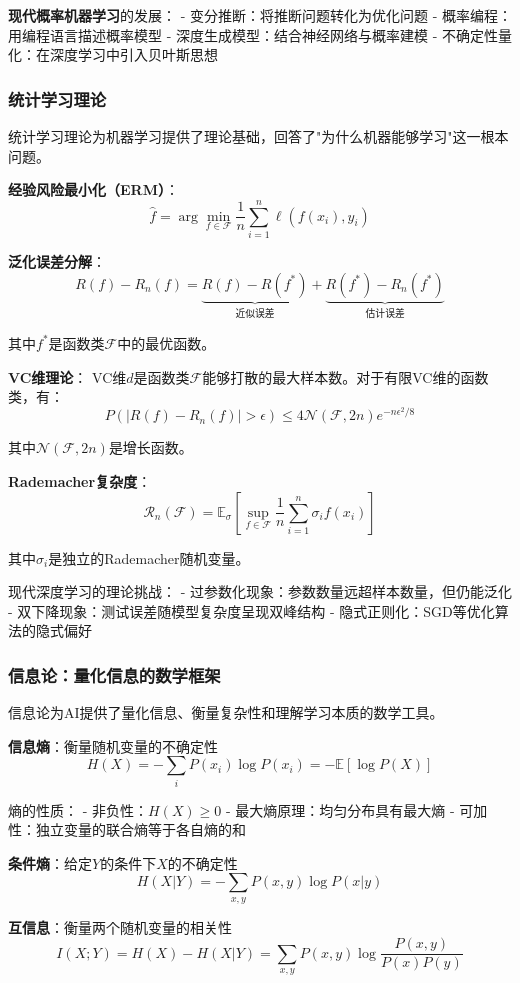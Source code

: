 \textbf{现代概率机器学习}的发展：
- 变分推断：将推断问题转化为优化问题
- 概率编程：用编程语言描述概率模型
- 深度生成模型：结合神经网络与概率建模
- 不确定性量化：在深度学习中引入贝叶斯思想

\subsubsection{统计学习理论}

统计学习理论为机器学习提供了理论基础，回答了"为什么机器能够学习"这一根本问题。

\textbf{经验风险最小化（ERM）}：
$$\hat{f} = \arg\min_{f \in \mathcal{F}} \frac{1}{n}\sum_{i=1}^n \ell(f(x_i), y_i)$$

\textbf{泛化误差分解}：
$$R(f) - R_n(f) = \underbrace{R(f) - R(f^*)}_{\text{近似误差}} + \underbrace{R(f^*) - R_n(f^*)}_{\text{估计误差}}$$

其中$f^*$是函数类$\mathcal{F}$中的最优函数。

\textbf{VC维理论}：
VC维$d$是函数类$\mathcal{F}$能够打散的最大样本数。对于有限VC维的函数类，有：
$$P\left(|R(f) - R_n(f)| > \epsilon\right) \leq 4\mathcal{N}(\mathcal{F}, 2n)e^{-n\epsilon^2/8}$$

其中$\mathcal{N}(\mathcal{F}, 2n)$是增长函数。

\textbf{Rademacher复杂度}：
$$\mathcal{R}_n(\mathcal{F}) = \mathbb{E}_{\sigma}\left[\sup_{f \in \mathcal{F}} \frac{1}{n}\sum_{i=1}^n \sigma_i f(x_i)\right]$$

其中$\sigma_i$是独立的Rademacher随机变量。

现代深度学习的理论挑战：
- 过参数化现象：参数数量远超样本数量，但仍能泛化
- 双下降现象：测试误差随模型复杂度呈现双峰结构
- 隐式正则化：SGD等优化算法的隐式偏好

\subsubsection{信息论：量化信息的数学框架}

信息论为AI提供了量化信息、衡量复杂性和理解学习本质的数学工具。

\textbf{信息熵}：衡量随机变量的不确定性
$$H(X) = -\sum_{i} P(x_i) \log P(x_i) = -\mathbb{E}[\log P(X)]$$

熵的性质：
- 非负性：$H(X) \geq 0$
- 最大熵原理：均匀分布具有最大熵
- 可加性：独立变量的联合熵等于各自熵的和

\textbf{条件熵}：给定$Y$的条件下$X$的不确定性
$$H(X|Y) = -\sum_{x,y} P(x,y) \log P(x|y)$$

\textbf{互信息}：衡量两个随机变量的相关性
$$I(X;Y) = H(X) - H(X|Y) = \sum_{x,y} P(x,y) \log \frac{P(x,y)}{P(x)P(y)}$$

